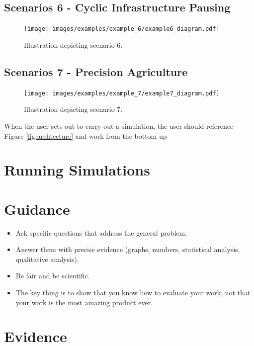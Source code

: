 \documentclass{l4proj}
\begin{document}
\subsection{Scenarios 6 - Cyclic Infrastructure Pausing}\label{eval:subsec:scenario 6}
\begin{figure}[h]
    \centering
    \texttt{[image: images/examples/example\_6/example6\_diagram.pdf]}
    ~
    \caption{Illustration depicting scenario 6.}
    \label{fig:example6_diagram}
\end{figure}

\subsection{Scenarios 7 - Precision Agriculture}\label{eval:subsec:scenario 7}
\begin{figure}[h]
    \centering
    \texttt{[image: images/examples/example\_7/example7\_diagram.pdf]}
    ~
    \caption{Illustration depicting scenario 7.}
    \label{fig:example7_diagram}
\end{figure}

When the user sets out to carry out a simulation, the user should reference Figure \ref{fig:archtecture} and work from the bottom up
\section{Running Simulations}\label{imp:sec:running-simulations}


\section{Guidance}
\begin{itemize}
    \item
        Ask specific questions that address the general problem.
    \item
        Answer them with precise evidence (graphs, numbers, statistical
        analysis, qualitative analysis).
    \item
        Be fair and be scientific.
    \item
        The key thing is to show that you know how to evaluate your work, not
        that your work is the most amazing product ever.
\end{itemize}

\section{Evidence}
\end{document}
